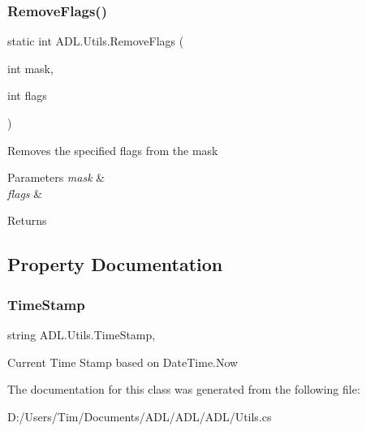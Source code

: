 \subsubsection{\texorpdfstring{Remove\+Flags()}{RemoveFlags()}}
{\footnotesize\ttfamily static int A\+D\+L.\+Utils.\+Remove\+Flags (\begin{DoxyParamCaption}\item[{int}]{mask,  }\item[{int}]{flags }\end{DoxyParamCaption})\hspace{0.3cm}{\ttfamily [static]}}



Removes the specified flags from the mask 


\begin{DoxyParams}{Parameters}
{\em mask} & \\
\hline
{\em flags} & \\
\hline
\end{DoxyParams}
\begin{DoxyReturn}{Returns}

\end{DoxyReturn}


\subsection{Property Documentation}
\mbox{\label{class_a_d_l_1_1_utils_a93a1013d16031cf968a4383b56f4b24f}} 
\subsubsection{\texorpdfstring{Time\+Stamp}{TimeStamp}}
{\footnotesize\ttfamily string A\+D\+L.\+Utils.\+Time\+Stamp\hspace{0.3cm}{\ttfamily [static]}, {\ttfamily [get]}}



Current Time Stamp based on Date\+Time.\+Now 



The documentation for this class was generated from the following file\+:\begin{DoxyCompactItemize}
\item 
D\+:/\+Users/\+Tim/\+Documents/\+A\+D\+L/\+A\+D\+L/\+A\+D\+L/Utils.\+cs\end{DoxyCompactItemize}
